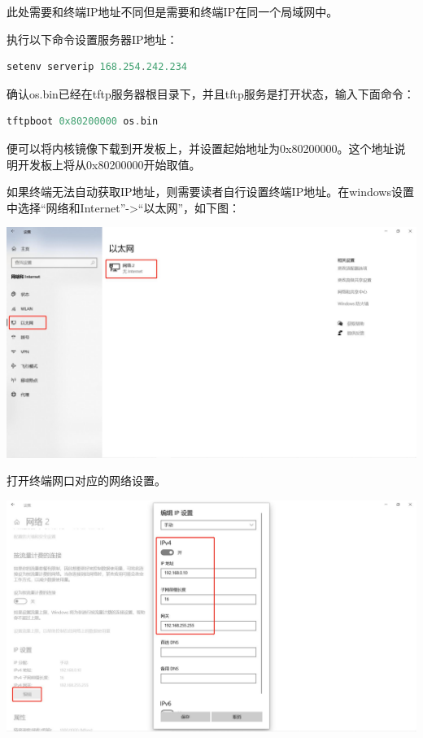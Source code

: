 {\begin{enumerate}
	此处需要和终端IP地址不同但是需要和终端IP在同一个局域网中。
	
	执行以下命令设置服务器IP地址：
	
	\begin{lstlisting}[language={Rust}]
	setenv serverip 168.254.242.234
	\end{lstlisting}
	
	确认os.bin已经在tftp服务器根目录下，并且tftp服务是打开状态，输入下面命令：
	
	\begin{lstlisting}[language={Rust}]
	tftpboot 0x80200000 os.bin
	\end{lstlisting}
	
	便可以将内核镜像下载到开发板上，并设置起始地址为0x80200000。这个地址说明开发板上将从0x80200000开始取值。
	
	如果终端无法自动获取IP地址，则需要读者自行设置终端IP地址。在windows设置中选择“网络和Internet”->“以太网”，如下图：
	
	\centering
	\includegraphics[width=0.9\linewidth]{figures/08-02-以太网设置界面.jpg}
	\raggedright
	
	打开终端网口对应的网络设置。
	
	\centering
	\includegraphics[width=0.9\linewidth]{figures/08-02-网络IP设置.jpg}
	\raggedright
	

\end{enumerate}}
